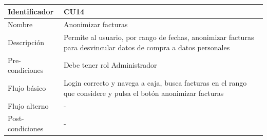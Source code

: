 \vspace{1em}
\par
\begin{tabular}{||p{3cm}|p{11cm}||} 
\hline
Identificador & CU14 \\ [0.5ex] 
\hline\hline
Nombre & Anonimizar facturas \\ 
\hline
Descripción & Permite al usuario, por rango de fechas, anonimizar facturas para desvincular datos de compra a datos personales \\
\hline
Pre-condiciones & Debe tener rol Administrador \\
\hline
Flujo básico & Login correcto y navega a caja, busca facturas en el rango que considere y pulsa el botón anonimizar facturas \\
\hline
Flujo alterno & - \\
\hline
Post-condiciones & - \\
\hline
\end{tabular}
